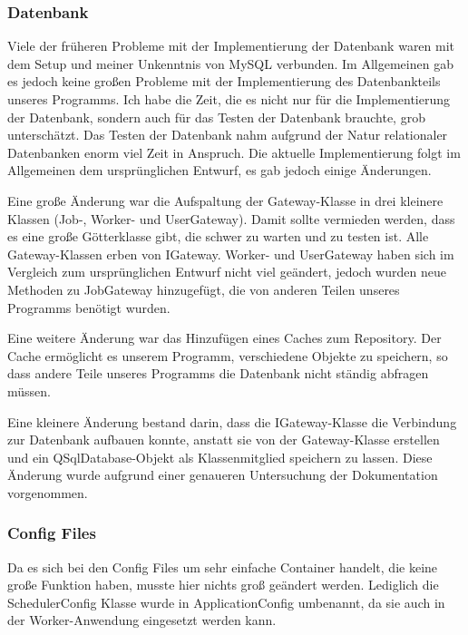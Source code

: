 \documentclass[a4paper,12pt]{article}
\begin{document}
\subsubsection{Datenbank}
\vspace{0.2cm}
Viele der früheren Probleme mit der Implementierung der Datenbank waren mit dem Setup und meiner Unkenntnis von MySQL verbunden. Im Allgemeinen gab es jedoch keine großen Probleme mit der Implementierung des Datenbankteils unseres Programms. Ich habe die Zeit, die es nicht nur für die Implementierung der Datenbank, sondern auch für das Testen der Datenbank brauchte, grob unterschätzt. Das Testen der Datenbank nahm aufgrund der Natur relationaler Datenbanken enorm viel Zeit in Anspruch. Die aktuelle Implementierung folgt im Allgemeinen dem ursprünglichen Entwurf, es gab jedoch einige Änderungen.\par 
\vspace{5mm}
Eine große Änderung war die Aufspaltung der Gateway-Klasse in drei kleinere Klassen (Job-, Worker- und UserGateway). Damit sollte vermieden werden, dass es eine große Götterklasse gibt, die schwer zu warten und zu testen ist. Alle Gateway-Klassen erben von IGateway. Worker- und UserGateway haben sich im Vergleich zum ursprünglichen Entwurf nicht viel geändert, jedoch wurden neue Methoden zu JobGateway hinzugefügt, die von anderen Teilen unseres Programms benötigt wurden.\par
\vspace{5mm}
Eine weitere Änderung war das Hinzufügen eines Caches zum Repository. Der Cache ermöglicht es unserem Programm, verschiedene Objekte zu speichern, so dass andere Teile unseres Programms die Datenbank nicht ständig abfragen müssen.\par
\vspace{5mm}
Eine kleinere Änderung bestand darin, dass die IGateway-Klasse die Verbindung zur Datenbank aufbauen konnte, anstatt sie von der Gateway-Klasse erstellen und ein QSqlDatabase-Objekt als Klassenmitglied speichern zu lassen. Diese Änderung wurde aufgrund einer genaueren Untersuchung der Dokumentation vorgenommen.

\subsubsection{Config Files}
\vspace{0.2cm}
Da es sich bei den Config Files um sehr einfache Container handelt, die keine große Funktion haben, musste hier nichts groß geändert werden. Lediglich die SchedulerConfig Klasse wurde in ApplicationConfig umbenannt, da sie auch in der Worker-Anwendung eingesetzt werden kann. 
\end{document}
